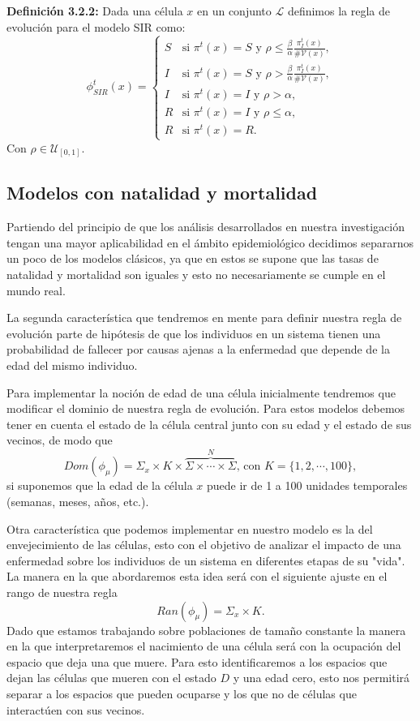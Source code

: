 \textbf{Definición 3.2.2:} Dada una célula $x$ en un conjunto $\mathcal{L}$ definimos la regla de evolución para el modelo SIR como:
\begin{equation}
    \phi_{SIR}^t(x)=\left\{\begin{array}{ll}
        S & \text{si }\pi^t(x)=S\text{ y }\rho\leq\frac{\beta}{\alpha}\frac{\pi_I^t(x)}{\#\mathcal{V}(x)}, \\
        I & \text{si }\pi^t(x)=S\text{ y }\rho>\frac{\beta}{\alpha}\frac{\pi_I^t(x)}{\#\mathcal{V}(x)}, \\
        I & \text{si }\pi^t(x)=I\text{ y }\rho>\alpha,\\
        R & \text{si }\pi^t(x)=I\text{ y }\rho\leq\alpha, \\
        R & \text{si }\pi^t(x)=R.
    \end{array}\right.
\end{equation}
Con $\rho\in\mathcal{U}_{[0,1]}$.
\subsection{Modelos con natalidad y mortalidad}
Partiendo del principio de que los análisis desarrollados en nuestra investigación tengan una mayor aplicabilidad en el ámbito epidemiológico decidimos separarnos un poco de los modelos clásicos, ya que en estos se supone que las tasas de natalidad y mortalidad son iguales y esto no necesariamente se cumple en el mundo real.

La segunda característica que tendremos en mente para definir nuestra regla de evolución parte de hipótesis de que los individuos en un sistema tienen una probabilidad de fallecer por causas ajenas a la enfermedad que depende de la edad del mismo individuo.

Para implementar la noción de edad de una célula inicialmente tendremos que modificar el dominio de nuestra regla de evolución. Para estos modelos debemos tener en cuenta el estado de la célula central junto con su edad y el estado de sus vecinos, de modo que 
$$Dom(\phi_\mu)=\Sigma_x\times K\times\overbrace{\Sigma\times\cdots\times\Sigma}^N\text{, con }K=\{1,2,\cdots,100\},$$
si suponemos que la edad de la célula $x$ puede ir de 1 a 100 unidades temporales (semanas, meses, años, etc.).

Otra característica que podemos implementar en nuestro modelo es la del envejecimiento de las células, esto con el objetivo de analizar el impacto de una enfermedad sobre los individuos de un sistema en diferentes etapas de su "vida". La manera en la que abordaremos esta idea será con el siguiente ajuste en el rango de nuestra regla
$$Ran(\phi_\mu)=\Sigma_x\times K.$$
Dado que estamos trabajando sobre poblaciones de tamaño constante la manera en la que interpretaremos el nacimiento de una célula será con la ocupación del espacio que deja una que muere. Para esto identificaremos a los espacios que dejan las células que mueren con el estado $D$ y una edad cero, esto nos permitirá separar a los espacios que pueden ocuparse y los que no de células que interactúen con sus vecinos.

